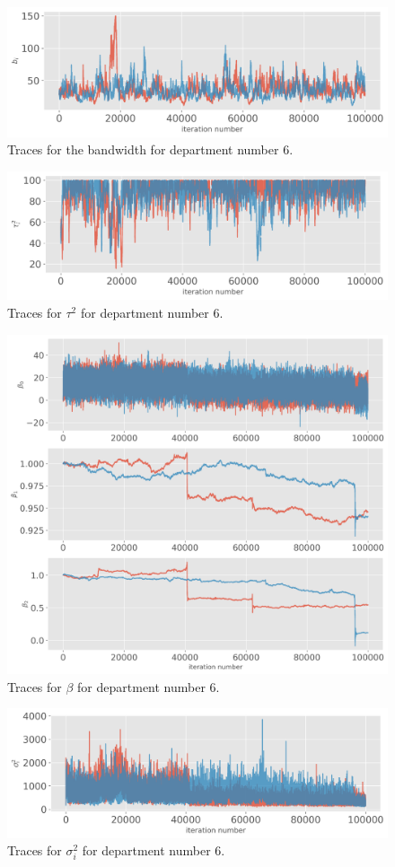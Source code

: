 \documentclass[paper=a4, fontsize=11pt]{scrartcl}
\begin{document}
\begin{figure}[!htb]
\centering
\includegraphics[width=.8\textwidth]{project/writeup/bandwidths.png}

\caption{Traces for the bandwidth for department number 6.}
\label{b}\end{figure}
\begin{figure}[!htb]
\centering
\includegraphics[width=.8\textwidth]{project/writeup/tau.png}
\caption{Traces for $\tau^2$ for department number 6.}
\label{tau}\end{figure}
\begin{figure}[!htb]
\centering
\includegraphics[width=.8\textwidth]{project/writeup/betas_traces.png}

\caption{Traces for $\beta$ for department number 6.}\label{beta}
\end{figure}
\begin{figure}[!htb]
\centering
\includegraphics[width=.8\textwidth]{project/writeup/sigma.png}
\caption{Traces for $\sigma_i^2$ for department number 6.}
\label{sigma}
\end{figure}
\end{document}
